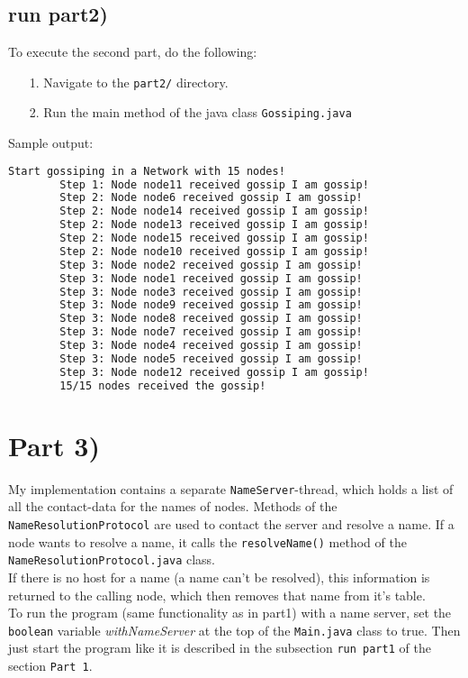 \documentclass{article}
\begin{document}
    \subsection*{run part2)}
    
      To execute the second part, do the following:
      \begin{itemize}
        \item[1.] Navigate to the \texttt{part2/} directory.
    	\item[2.] Run the main method of the java class \texttt{Gossiping.java}
      \end{itemize}
      Sample output:\\
      \begin{lstlisting}[language=sh]
        Start gossiping in a Network with 15 nodes!
        Step 1: Node node11 received gossip I am gossip!
        Step 2: Node node6 received gossip I am gossip!
        Step 2: Node node14 received gossip I am gossip!
        Step 2: Node node13 received gossip I am gossip!
        Step 2: Node node15 received gossip I am gossip!
        Step 2: Node node10 received gossip I am gossip!
        Step 3: Node node2 received gossip I am gossip!
        Step 3: Node node1 received gossip I am gossip!
        Step 3: Node node3 received gossip I am gossip!
        Step 3: Node node9 received gossip I am gossip!
        Step 3: Node node8 received gossip I am gossip!
        Step 3: Node node7 received gossip I am gossip!
        Step 3: Node node4 received gossip I am gossip!
        Step 3: Node node5 received gossip I am gossip!
        Step 3: Node node12 received gossip I am gossip!
        15/15 nodes received the gossip!
      \end{lstlisting}
      
  \section*{Part 3)}
  
    My implementation contains a separate \texttt{NameServer}-thread, which holds a list of all the contact-data for the names of nodes. Methods of the \texttt{NameResolutionProtocol} are used to contact the server and resolve a name. If a node wants to resolve a name, it calls the \texttt{resolveName()} method of the \texttt{NameResolutionProtocol.java} class.\\
    If there is no host for a name (a name can't be resolved), this information is returned to the calling node, which then removes that name from it's table.\\
    To run the program (same functionality as in part1) with a name server, set the \texttt{boolean} variable \textit{withNameServer} at the top of the \texttt{Main.java} class to true. Then just start the program like it is described in the subsection \texttt{run part1} of the section \texttt{Part 1}.
	
\end{document}
